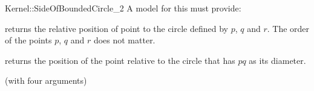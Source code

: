 \begin{ccRefFunctionObjectConcept}{Kernel::SideOfBoundedCircle_2}
A model for this must provide:


         {returns the relative position of point 
          to the circle defined by $p$, $q$ and $r$. The order
          of the points $p$, $q$ and $r$ does not matter.
          }

         {returns the position of the point  relative to the circle
          that has $pq$ as its diameter.}

\ccRefines
{} (with four arguments)

\ccSeeAlso
{} \\

\end{ccRefFunctionObjectConcept}
